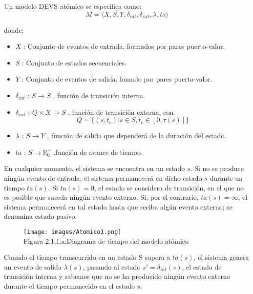 Un modelo DEVS atómico se especifica como:
\begin{equation}\label{eq:DevsAtomic}
M = \langle X,S,Y,\delta_{int} , \delta_{ext} , \lambda, ta\rangle
\end{equation}

\noindent donde:

\begin{itemize}
\item $X$ : Conjunto de eventos de entrada, formados por pares puerto-valor.	
\item $S$ : Conjunto de estados secuenciales.
\item $Y$ : Conjunto de eventos de salida, fomado por pares puerto-valor.
\item $\delta_{int}$ : $S\rightarrow S$ , función de transición interna.
\item $\delta_{ext}$ : $Q\times X\rightarrow S$ , función de transición externa, con
\begin{equation}\label{eq:FullState}
Q = \lbrace(s,t_e) | s\in S, t_e\in [0,\tau (s)]\rbrace
\end{equation}
\item $\lambda$ : $S\rightarrow Y$ , función de salida que dependerá de la duración del estado.
\item $ta$ : $S\rightarrow \mathbb{R}^{+}_{0}$ ,función de avance de tiempo.
\end{itemize}

En cualquier momento, el sistema se encuentra en un estado $s$. Si no se produce ningún evento de entrada, el sistema permanecerá en dicho estado $s$ durante un tiempo $ta(s)$. Si $ta(s)=0$, el estado se considera de transición, en el que no es posible que suceda ningún evento externo. Si, por el contrario, $ta(s)=\infty$, el sistema permanecerá en tal estado hasta que reciba algún evento externo; se denomina estado pasivo.

\begin{figure}[H]
\begin{center}
\texttt{[image: images/Atomico1.png]}\\[0.5cm]
Figura 2.1.1.a:Diagrama de tiempo del modelo atómico
\end{center}
\end{figure}

Cuando el tiempo transcurrido en un estado S supera a $ta(s)$, el sistema genera un evento de salida $\lambda(s)$, pasando al estado $s'=\delta_{int}(s)$, el estado de transición interna y sabemos que no se ha producido ningún evento externo durante el tiempo permanecido en el estado $s$.

